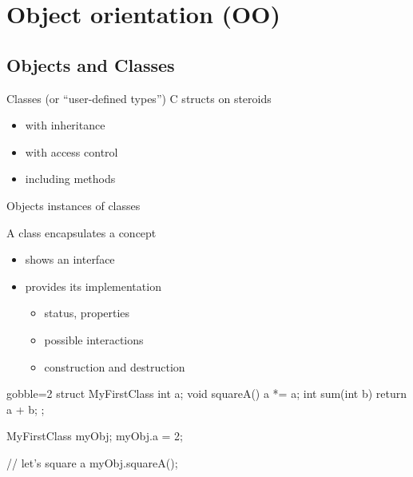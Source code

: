 \section[OO]{Object orientation (OO)}

\subsection[OO]{Objects and Classes}

\begin{frame}[fragile]
  \begin{block}{Classes (or ``user-defined types'')}
    C structs on steroids
    \begin{itemize}
    \item with inheritance
    \item with access control
    \item including methods
    \end{itemize}
  \end{block}
  \begin{block}{Objects}
    instances of classes
  \end{block}
  \begin{block}{A class encapsulates a concept}
    \begin{itemize}
    \item shows an interface
    \item provides its implementation
      \begin{itemize}
      \item status, properties
      \item possible interactions
      \item construction and destruction
      \end{itemize}
    \end{itemize}
  \end{block}
\end{frame}


\begin{frame}[fragile]
  \begin{multicols}{2}
    \begin{cppcode*}{gobble=2}
      struct MyFirstClass {
        int a;
        void squareA() {
          a *= a;
        }
        int sum(int b) {
          return a + b;
        }
      };

      MyFirstClass myObj;
      myObj.a = 2;

      // let's square a
      myObj.squareA();
    \end{cppcode*}
    \columnbreak
    \center
    \null \vfill
    \vfill \null
  \end{multicols}
\end{frame}

